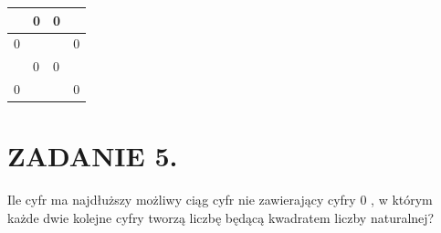 \documentclass[10pt]{article}
\begin{document}
\begin{center}
\begin{tabular}{|l|l|l|l|}
\hline
 & 0 & 0 &  \\
\hline
0 &  &  & 0 \\
\hline
 & 0 & 0 &  \\
\hline
0 &  &  & 0 \\
\hline
\end{tabular}
\end{center}

\section*{ZADANIE 5.}
Ile cyfr ma najdłuższy możliwy ciąg cyfr nie zawierający cyfry 0 , w którym każde dwie kolejne cyfry tworzą liczbę będącą kwadratem liczby naturalnej?
\end{document}
